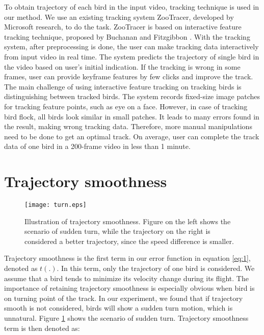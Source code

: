 To obtain trajectory of each bird in the input video, tracking technique is used in our method. We use an existing tracking system ZooTracer\cite{ZooTracer}, developed by Microsoft research, to do the task. ZooTracer is based on interactive feature tracking technique, proposed by Buchanan and Fitzgibbon \cite{Tracking}. With the tracking system, after preprocessing is done, the user can make tracking data interactively from input video in real time. The system predicts the trajectory of single bird in the video based on user's initial indication. If the tracking is wrong in some frames, user can provide keyframe features by few clicks and improve the track.
The main challenge of using interactive feature tracking on tracking birds is distinguishing between tracked birds. The system records fixed-size image patches for tracking feature points, such as eye on a face. However, in case of tracking bird flock, all birds look similar in small patches. It leads to many errors found in the result, making wrong tracking data. Therefore, more manual manipulations need to be done to get an optimal track. On average, user can complete the track data of one bird in a 200-frame video in less than 1 minute.



\section{Trajectory smoothness}


\begin{figure}[h]
 \begin{center}
  \texttt{[image: turn.eps]}
 \end{center}
 \caption{Illustration of trajectory smoothness. Figure on the left shows the scenario of sudden turn, while the trajectory on the right is considered a better trajectory, since the speed difference is smaller.}
 \label{figure:turn}
\end{figure}



Trajectory smoothness is the first term in our error function in equation \ref{eq:1}, denoted as $t(.)$. In this term, only the trajectory of one bird is considered. We assume that a bird tends to minimize its velocity change during its flight. The importance of retaining trajectory smoothness is especially obvious when bird is on turning point of the track. In our experiment, we found that if trajectory smooth is not considered, birds will show a sudden turn motion, which is unnatural. Figure \ref{figure:turn} shows the scenario of sudden turn. Trajectory smoothness term is then denoted as:

